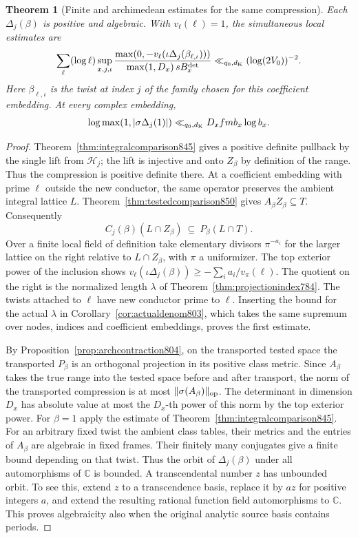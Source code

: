 \documentclass[a4paper,11pt]{article}
\newtheorem{theorem}[proposition]{Theorem}
\theoremstyle{definition}
\theoremstyle{remark}
\numberwithin{equation}{section}
\begin{document}
\begin{theorem}[Finite and archimedean estimates for the same compression]
\leavevmode\label{thm:compressionbudget851}
Each \(\Delta_j(\beta)\) is positive and algebraic. With
\(v_\ell(\ell)=1\), the simultaneous local estimates are
\[
 \sum_\ell(\log\ell)\sup_{x,j,\iota}
 \frac{\max(0,-v_\ell(\iota\Delta_j(\beta_{\ell,\iota})))}
      {\max(1,D_x)\,sB_x^{\rm det}}
     \ll_{q_0,d_{\rm K}}(\log(2V_0))^{-2}.
\]
Here \(\beta_{\ell,\iota}\) is the twist at index \(j\) of
the family chosen for this coefficient embedding. At every
complex embedding,
\[
      \log\max(1,|\sigma\Delta_j(1)|)
          \ll_{q_0,d_{\rm K}} D_x f m b_x\log b_x .
\]
\end{theorem}
\begin{proof}
Theorem~\ref{thm:integralcomparison845} gives a positive
definite pullback by the single lift from \(\mathcal H_j\);
the lift is injective and onto \(Z_\beta\) by definition of
the range. Thus the compression is positive definite there.
At a coefficient embedding with prime \(\ell\) outside the
new conductor, the same operator preserves the ambient
integral lattice \(L\). Theorem~\ref{thm:testedcomparison850}
gives \(A_\beta Z_\beta\subseteq T\). Consequently
\[
           C_j(\beta)(L\cap Z_\beta)\ \subseteq\
                         P_\beta(L\cap T).
\]
Over a finite local field of definition take elementary
divisors \(\pi^{-a_i}\) for the larger lattice on the right
relative to \(L\cap Z_\beta\), with \(\pi\) a uniformizer.
The top exterior power of the inclusion shows
\(v_\ell(\iota\Delta_j(\beta))\ge-\sum_i a_i/v_\pi(\ell)\).
The quotient on the right is the normalized length
\(\lambda\) of Theorem~\ref{thm:projectionindex784}.
The twists attached to \(\ell\) have new conductor prime to
\(\ell\). Inserting the bound for the actual \(\lambda\)
in Corollary~\ref{cor:actualdenom803}, which takes the same
supremum over nodes, indices and coefficient embeddings, proves
the first estimate.

By Proposition~\ref{prop:archcontraction804}, on the transported
tested space the transported \(P_\beta\) is an orthogonal
projection in its positive class metric. Since \(A_\beta\)
takes the true range into the tested space before and after
transport, the norm of the transported compression is at most
\(\|\sigma(A_\beta)\|_{\rm op}\). The determinant in dimension
\(D_x\) has absolute value at most the \(D_x\)-th power of
this norm by the top exterior power. For \(\beta=1\) apply the
estimate of Theorem~\ref{thm:integralcomparison845}. For an
arbitrary fixed twist the ambient class tables, their metrics
and the entries of \(A_\beta\) are algebraic in fixed frames.
Their finitely many conjugates give a finite bound depending
on that twist. Thus the orbit of \(\Delta_j(\beta)\) under all
automorphisms of \(\mathbb C\) is bounded. A transcendental
number \(z\) has unbounded orbit. To see this, extend \(z\) to a
transcendence basis, replace it by \(az\) for positive integers
\(a\), and extend the resulting rational function field
automorphisms to \(\mathbb C\). This proves algebraicity also
when the original analytic source basis contains periods.
\end{proof}
\end{document}
